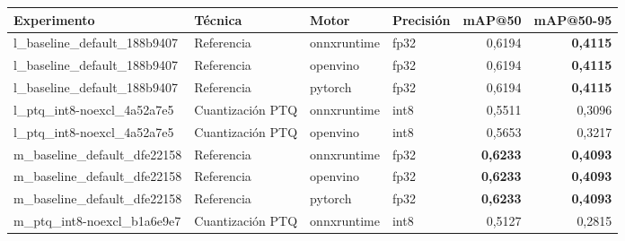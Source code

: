 \ifdefined\tfmedgetitle\else\newsavebox{\tfmedgetitle}\fi
\ifdefined\tfmedgenotes\else\newsavebox{\tfmedgenotes}\fi
\begin{landscape}
\begin{table}[htbp]
  \centering
  \usebox{\tfmedgetitle}\par
  \footnotesize
  \begin{adjustbox}{max width=\linewidth, max totalheight=\dimexpr\textheight-\ht\tfmedgetitle-\dp\tfmedgetitle-\ht\tfmedgenotes-\dp\tfmedgenotes-6pt\relax}
  \begin{tabular}{llllrr}
    \toprule
    Experimento & Técnica & Motor & Precisión & mAP@50 & mAP@50-95 \\
    \midrule
    l\_baseline\_default\_188b9407 & Referencia & onnxruntime & fp32 & 0,6194 & \textbf{0,4115} \\
    l\_baseline\_default\_188b9407 & Referencia & openvino & fp32 & 0,6194 & \textbf{0,4115} \\
    l\_baseline\_default\_188b9407 & Referencia & pytorch & fp32 & 0,6194 & \textbf{0,4115} \\
    l\_ptq\_int8-noexcl\_4a52a7e5 & Cuantización PTQ & onnxruntime & int8 & 0,5511 & 0,3096 \\
    l\_ptq\_int8-noexcl\_4a52a7e5 & Cuantización PTQ & openvino & int8 & 0,5653 & 0,3217 \\
    m\_baseline\_default\_dfe22158 & Referencia & onnxruntime & fp32 & \textbf{0,6233} & \textbf{0,4093} \\
    m\_baseline\_default\_dfe22158 & Referencia & openvino & fp32 & \textbf{0,6233} & \textbf{0,4093} \\
    m\_baseline\_default\_dfe22158 & Referencia & pytorch & fp32 & \textbf{0,6233} & \textbf{0,4093} \\
    m\_ptq\_int8-noexcl\_b1a6e9e7 & Cuantización PTQ & onnxruntime & int8 & 0,5127 & 0,2815 \\

\end{tabular}
\end{adjustbox}
\end{table}
\end{landscape}

